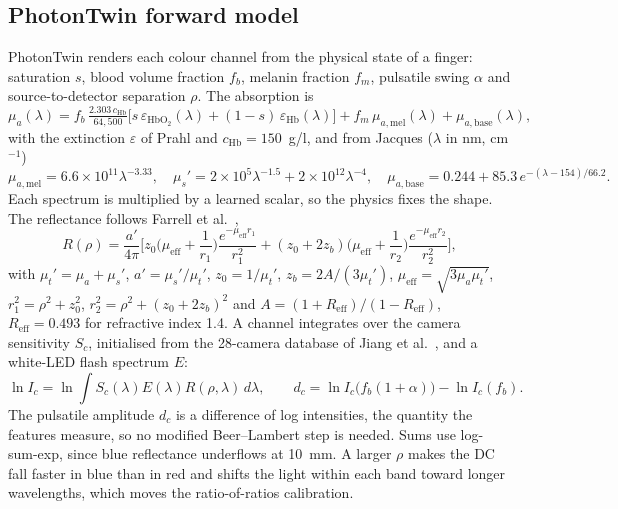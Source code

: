 \documentclass[11pt,letterpaper]{article}
\begin{document}
\subsection{PhotonTwin forward model}\label{sec:twin}
PhotonTwin renders each colour channel from the physical state of a finger: saturation $s$, blood volume fraction $f_b$, melanin fraction $f_m$, pulsatile swing $\alpha$ and source-to-detector separation $\rho$. The absorption is
\begin{equation}
\mu_a(\lambda)=f_b\,\tfrac{2.303\,c_{\mathrm{Hb}}}{64{,}500}\big[s\,\varepsilon_{\mathrm{HbO_2}}(\lambda)+(1-s)\,\varepsilon_{\mathrm{Hb}}(\lambda)\big]+f_m\,\mu_{a,\mathrm{mel}}(\lambda)+\mu_{a,\mathrm{base}}(\lambda),
\end{equation}
with the extinction $\varepsilon$ of Prahl \cite{prahl1998} and $c_{\mathrm{Hb}}=150$~g/l, and from Jacques \cite{jacques1998} ($\lambda$ in nm, cm$^{-1}$)
\begin{equation}
\mu_{a,\mathrm{mel}}=6.6\times10^{11}\lambda^{-3.33},\quad
\mu_s'=2\times10^{5}\lambda^{-1.5}+2\times10^{12}\lambda^{-4},\quad
\mu_{a,\mathrm{base}}=0.244+85.3\,e^{-(\lambda-154)/66.2}.
\end{equation}
Each spectrum is multiplied by a learned scalar, so the physics fixes the shape. The reflectance follows Farrell et al.\ \cite{farrell1992},
\begin{equation}
R(\rho)=\frac{a'}{4\pi}\Big[z_0\Big(\mu_{\mathrm{eff}}+\frac1{r_1}\Big)\frac{e^{-\mu_{\mathrm{eff}}r_1}}{r_1^2}+(z_0+2z_b)\Big(\mu_{\mathrm{eff}}+\frac1{r_2}\Big)\frac{e^{-\mu_{\mathrm{eff}}r_2}}{r_2^2}\Big],
\end{equation}
with $\mu_t'=\mu_a+\mu_s'$, $a'=\mu_s'/\mu_t'$, $z_0=1/\mu_t'$, $z_b=2A/(3\mu_t')$, $\mu_{\mathrm{eff}}=\sqrt{3\mu_a\mu_t'}$, $r_{1}^2=\rho^2+z_0^2$, $r_2^2=\rho^2+(z_0+2z_b)^2$ and $A=(1+R_{\mathrm{eff}})/(1-R_{\mathrm{eff}})$, $R_{\mathrm{eff}}=0.493$ for refractive index 1.4. A channel integrates over the camera sensitivity $S_c$, initialised from the 28-camera database of Jiang et al.\ \cite{jiang2013}, and a white-LED flash spectrum $E$:
\begin{equation}
\ln I_c=\ln\!\int S_c(\lambda)E(\lambda)R(\rho,\lambda)\,d\lambda,\qquad
d_c=\ln I_c\big(f_b(1+\alpha)\big)-\ln I_c(f_b).
\end{equation}
The pulsatile amplitude $d_c$ is a difference of log intensities, the quantity the features measure, so no modified Beer--Lambert step is needed. Sums use log-sum-exp, since blue reflectance underflows at 10~mm. A larger $\rho$ makes the DC fall faster in blue than in red and shifts the light within each band toward longer wavelengths, which moves the ratio-of-ratios calibration.
\end{document}
